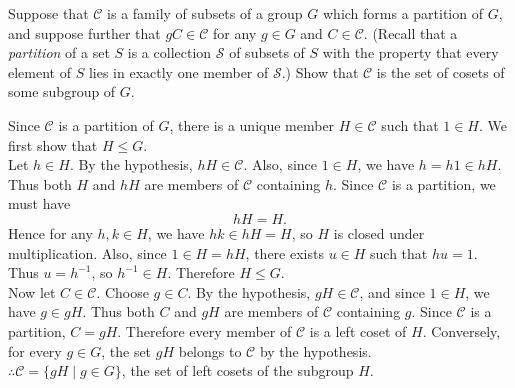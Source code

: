 \documentclass[../Odyssey_Project.tex]{subfiles}
\begin{document}
\begin{exercise}
\label{ex:1.8}
Suppose that $\mathcal{C}$ is a family of subsets of a group $G$ which forms a partition of $G$, and suppose further that $gC \in \mathcal{C}$ for any $g \in G$ and $C \in \mathcal{C}$. (Recall that a \emph{partition} of a set $S$ is a collection $\mathcal{S}$ of subsets of $S$ with the property that every element of $S$ lies in exactly one member of $\mathcal{S}$.) Show that $\mathcal{C}$ is the set of cosets of some subgroup of $G$.
\end{exercise}
\begin{solution}
Since \(\mathcal C\) is a partition of \(G\), there is a unique member \(H \in \mathcal C\) such that \(1 \in H\). We first show that \(H \leq G\). \\
Let \(h \in H\). By the hypothesis, \(hH \in \mathcal C\). Also, since \(1 \in H\), we have \(h = h1 \in hH\). Thus both \(H\) and \(hH\) are members of \(\mathcal C\) containing \(h\). Since \(\mathcal C\) is a partition, we must have
\[
    hH = H.
\]
Hence for any \(h,k \in H\), we have \(hk \in hH = H\), so \(H\) is closed under multiplication. Also, since \(1 \in H = hH\), there exists \(u \in H\) such that \(hu = 1\). Thus \(u = h^{-1}\), so \(h^{-1} \in H\). Therefore \(H \leq G\). \\
Now let \(C \in \mathcal C\). Choose \(g \in C\). By the hypothesis, \(gH \in \mathcal C\), and since \(1 \in H\), we have \(g \in gH\). Thus both \(C\) and \(gH\) are members of \(\mathcal C\) containing \(g\). Since \(\mathcal C\) is a partition, \(C = gH\). Therefore every member of \(\mathcal C\) is a left coset of \(H\). Conversely, for every \(g \in G\), the set \(gH\) belongs to \(\mathcal C\) by the hypothesis. \\
\(\therefore \mathcal C = \{gH \mid g \in G\}\), the set of left cosets of the subgroup \(H\).
\end{solution}
\end{document}
